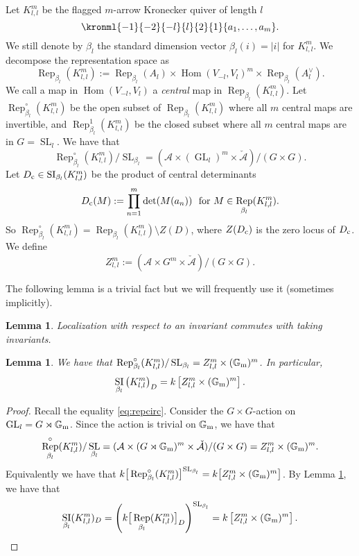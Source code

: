 \documentclass{amsart}
\newtheorem{lemma}[theorem]{Lemma}
\theoremstyle{definition}
\theoremstyle{remark}
\numberwithin{equation}{section}
\DeclareMathOperator{\GL}{GL}
\DeclareMathOperator{\Hom}{Hom}
\DeclareMathOperator{\Rep}{Rep}
\DeclareMathOperator{\SI}{SI}
\DeclareMathOperator{\SL}{SL}
\newcommand{\mc}[1]{\mathcal{#1}}
\newcommand{\mb}[1]{\mathbb{#1}}
\newcommand{\mch}[1]{\check{\mathcal{#1}}}
\newcommand{\kllm}{{K_{l,l}^m}}
\newcommand{\zllm}{{Z_{l,l}^m}}
\newcommand{\bl}{{\beta_l}}
\begin{document}
Let $\kllm$ be the flagged $m$-arrow Kronecker quiver of length $l$
$$\kronml{-1}{-2}{-l}{l}{2}{1}{a_1,\dots,a_m}.$$
We still denote by $\bl$ the standard dimension vector $\bl(i)=|i|$ for $\kllm$.
We decompose the representation space as 
$$\Rep_\bl(\kllm):=\Rep_\bl(A_l) \times \Hom(V_{-l},V_l)^m \times \Rep_\bl(A_l^\vee).$$
We call a map in $\Hom(V_{-l},V_l)$ a {\em central} map in $\Rep_\bl(\kllm)$.
Let $\Rep_{\bl}^\circ(\kllm)$ be the open subset of $\Rep_{\bl}(\kllm)$ where all $m$ central maps are invertible,
and $\Rep_{\bl}^1(\kllm)$ be the closed subset where all $m$ central maps are in $G=\SL_l$.
We have that \begin{equation} \label{eq:repcirc} \Rep_{\bl}^\circ(\kllm)/\SL_\bl=(\mc{A}\times (\GL_l)^m \times \mch{A})/(G\times G).
\end{equation}
Let $D_{\rm c}\in \SI_\bl(\kllm)$ be the product of central determinants
$$D_{\rm c}(M):=\prod_{n=1}^m \det(M(a_n))\ \text{ for $M\in\Rep_\bl(\kllm)$.}$$
So $\Rep_{\bl}^\circ(\kllm)=\Rep_{\bl}(\kllm)\setminus Z(D)$, where $Z(D_{\rm c})$ is the zero locus of $D_{\rm c}$.
We define 
$$\zllm:=(\mc{A} \times G^m \times \mch{A})/{(G\times G)}.$$

The following lemma is a trivial fact but we will frequently use it (sometimes implicitly). 
\begin{lemma} \label{L:locinv}
	Localization with respect to an invariant commutes with taking invariants.
\end{lemma}

\begin{lemma} \label{L:localdet} We have that $\Rep_{\bl}^\circ(\kllm)/\SL_\bl = \zllm\times (\mb{G}_{\rm m})^m$.
In particular, 
	$$\SI_\bl\left(\kllm\right)_D = k\left[\zllm\times (\mb{G}_{\rm m})^m\right].$$
\end{lemma}

\begin{proof} Recall the equality \eqref{eq:repcirc}. Consider the $G\times G$-action on $\GL_l=G\rtimes \mb{G}_{\rm m}$.
	Since the action is trivial on $\mb{G}_{\rm m}$, we have that
$$\Rep_\bl^\circ(\kllm)/\SL_\bl=(\mc{A} \times (G\rtimes \mb{G}_{\rm m})^m \times \mch{A})/(G\times G) = \zllm\times (\mb{G}_{\rm m})^m.$$
Equivalently we have that $k\big[\Rep_\bl^\circ(\kllm)\big]^{\SL_\bl} = k\big[\zllm\times (\mb{G}_{\rm m})^m\big]$.
By Lemma \ref{L:locinv}, we have that
	$$\SI_\bl(\kllm)_D = \left(k\big[\Rep_\bl(\kllm)\big]_D\right)^{\SL_\bl} = k\left[\zllm\times (\mb{G}_{\rm m})^m\right].$$
\end{proof}
\end{document}
